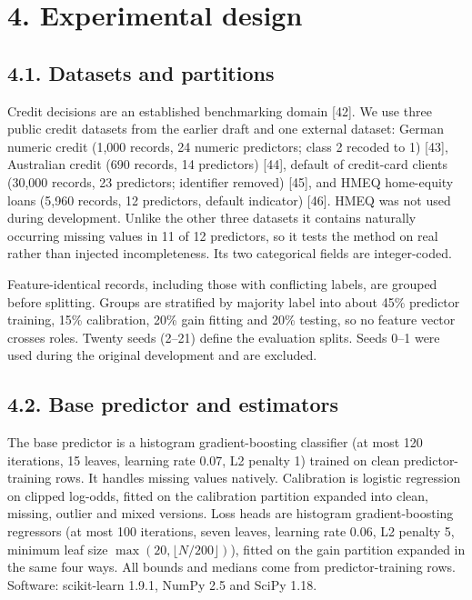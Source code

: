 \documentclass[
  11pt,
]{article}
\begin{document}
\hypertarget{experimental-design}{%
\section{4. Experimental design}\label{experimental-design}}

\hypertarget{datasets-and-partitions}{%
\subsection{4.1. Datasets and
partitions}\label{datasets-and-partitions}}

Credit decisions are an established benchmarking domain {[}42{]}. We use
three public credit datasets from the earlier draft and one external
dataset: German numeric credit (1,000 records, 24 numeric predictors;
class 2 recoded to 1) {[}43{]}, Australian credit (690 records, 14
predictors) {[}44{]}, default of credit-card clients (30,000 records, 23
predictors; identifier removed) {[}45{]}, and HMEQ home-equity loans
(5,960 records, 12 predictors, default indicator) {[}46{]}. HMEQ was not
used during development. Unlike the other three datasets it contains
naturally occurring missing values in 11 of 12 predictors, so it tests
the method on real rather than injected incompleteness. Its two
categorical fields are integer-coded.

Feature-identical records, including those with conflicting labels, are
grouped before splitting. Groups are stratified by majority label into
about 45\% predictor training, 15\% calibration, 20\% gain fitting and
20\% testing, so no feature vector crosses roles. Twenty seeds (2--21)
define the evaluation splits. Seeds 0--1 were used during the original
development and are excluded.

\hypertarget{base-predictor-and-estimators}{%
\subsection{4.2. Base predictor and
estimators}\label{base-predictor-and-estimators}}

The base predictor is a histogram gradient-boosting classifier (at most
120 iterations, 15 leaves, learning rate 0.07, L2 penalty 1) trained on
clean predictor-training rows. It handles missing values natively.
Calibration is logistic regression on clipped log-odds, fitted on the
calibration partition expanded into clean, missing, outlier and mixed
versions. Loss heads are histogram gradient-boosting regressors (at most
100 iterations, seven leaves, learning rate 0.06, L2 penalty 5, minimum
leaf size \(\max(20,\lfloor N/200\rfloor)\)), fitted on the gain
partition expanded in the same four ways. All bounds and medians come
from predictor-training rows. Software: scikit-learn 1.9.1, NumPy 2.5
and SciPy 1.18.
\end{document}
